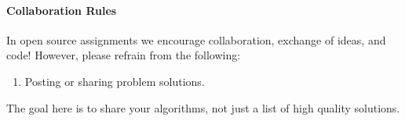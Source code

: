 \documentclass[11pt]{article}
\begin{document}
%
\paragraph{Collaboration Rules} 

In open source assignments we encourage collaboration, exchange of ideas, and code!  However, please refrain from the following:
\begin{enumerate}
\item Posting or sharing problem solutions.
\end{enumerate}
The goal here is to share your algorithms, not just a list of high quality solutions.





 

\end{document}
